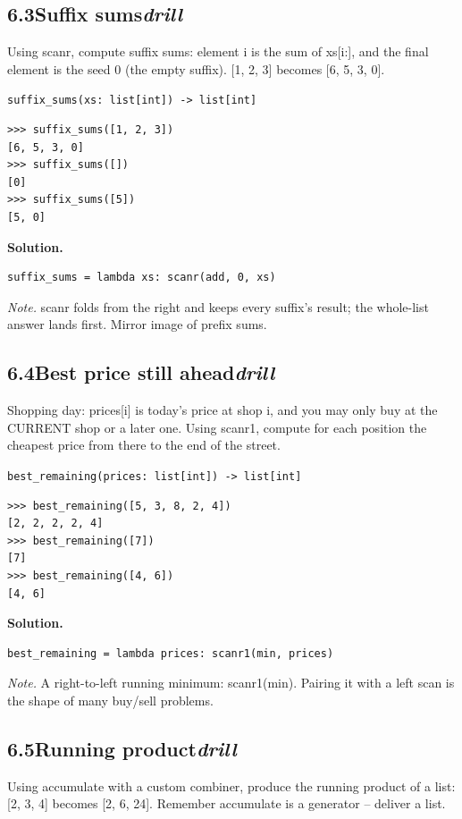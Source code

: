 \documentclass[10pt,letterpaper]{book}
\begin{document}
\subsection*{6.3\quad Suffix sums\hfill\textnormal{\textit{drill}}}
Using scanr, compute suffix sums: element i is the sum of xs[i:], and the final element is the seed 0 (the empty suffix). [1, 2, 3] becomes [6, 5, 3, 0].

\noindent\texttt{suffix\_sums(xs: list[int]) -> list[int]}
\begin{lstlisting}[style=ex]
>>> suffix_sums([1, 2, 3])
[6, 5, 3, 0]
>>> suffix_sums([])
[0]
>>> suffix_sums([5])
[5, 0]
\end{lstlisting}
\noindent\textbf{Solution.}
\begin{lstlisting}[style=code]
suffix_sums = lambda xs: scanr(add, 0, xs)
\end{lstlisting}
\noindent\textit{Note.} scanr folds from the right and keeps every suffix's result; the whole-list answer lands first. Mirror image of prefix sums.

\subsection*{6.4\quad Best price still ahead\hfill\textnormal{\textit{drill}}}
Shopping day: prices[i] is today's price at shop i, and you may only buy at the CURRENT shop or a later one. Using scanr1, compute for each position the cheapest price from there to the end of the street.

\noindent\texttt{best\_remaining(prices: list[int]) -> list[int]}
\begin{lstlisting}[style=ex]
>>> best_remaining([5, 3, 8, 2, 4])
[2, 2, 2, 2, 4]
>>> best_remaining([7])
[7]
>>> best_remaining([4, 6])
[4, 6]
\end{lstlisting}
\noindent\textbf{Solution.}
\begin{lstlisting}[style=code]
best_remaining = lambda prices: scanr1(min, prices)
\end{lstlisting}
\noindent\textit{Note.} A right-to-left running minimum: scanr1(min). Pairing it with a left scan is the shape of many buy/sell problems.

\subsection*{6.5\quad Running product\hfill\textnormal{\textit{drill}}}
Using accumulate with a custom combiner, produce the running product of a list: [2, 3, 4] becomes [2, 6, 24]. Remember accumulate is a generator -- deliver a list.
\end{document}
